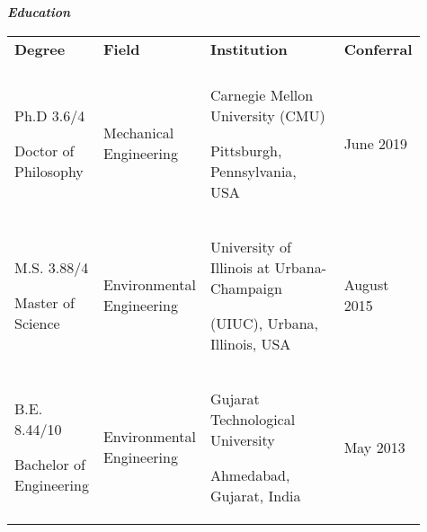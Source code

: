 \documentclass{article}
\begin{document}
\hrulefill
\textit{\textbf{  Education  }}
\hrulefill
\vspace{-6mm}
\begin{center}
\begin{tabular}{p{0.17\linewidth} p{0.19\linewidth} p{0.40\linewidth} p{0.15\linewidth}}
\textbf{Degree} & \textbf{Field} & \textbf{Institution} & \textbf{Conferral}\\
\\[-2ex]
Ph.D {\small 3.6/4}\newline \begin{footnotesize}Doctor of Philosophy\end{footnotesize}
&
Mechanical \newline Engineering
&
Carnegie Mellon University {\footnotesize (CMU)}\newline \begin{footnotesize}
Pittsburgh, Pennsylvania, USA
\end{footnotesize}
&
June 2019\\[4ex]

M.S. {\small 3.88/4}\newline \begin{footnotesize}Master of Science\end{footnotesize}
&
Environmental \newline Engineering
&
University of Illinois at Urbana-Champaign \newline \begin{footnotesize}
(UIUC), Urbana, Illinois, USA
\end{footnotesize}
&
August 2015\\[4ex]

B.E. {\small 8.44/10} \newline \begin{footnotesize}Bachelor of Engineering\end{footnotesize}
&
Environmental \newline Engineering
&
Gujarat Technological University \newline \begin{footnotesize}
Ahmedabad, Gujarat, India
\end{footnotesize}
&
May 2013
\end{tabular}
\end{center}
\vspace{2mm}
\end{document}
